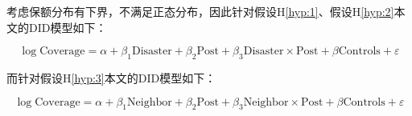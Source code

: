 考虑保额分布有下界，不满足正态分布，因此针对假设H\ref{hyp:1}、假设H\ref{hyp:2}本文的DID模型如下：

\begin{equation}
    \log\text{Coverage}=\alpha+\beta_1\text{Disaster}+\beta_2\text{Post}+\beta_3\text{Disaster}\times\text{Post}+\beta\text{Controls}+\varepsilon
    \label{eq:DID_1}
\end{equation}

而针对假设H\ref{hyp:3}本文的DID模型如下：

\begin{equation}
    \log\text{Coverage}=\alpha+\beta_1\text{Neighbor}+\beta_2\text{Post}+\beta_3\text{Neighbor}\times\text{Post}+\beta\text{Controls}+\varepsilon
    \label{eq:DID_2}
\end{equation}


